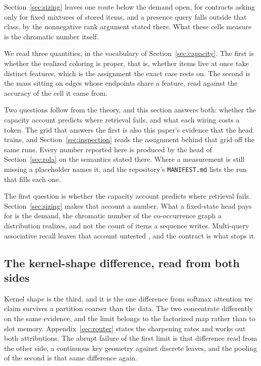 Section~\ref{sec:sizing} leaves one route below the demand open, for contracts asking only for fixed mixtures of stored items, and a presence query falls outside that class, by the nonnegative rank argument stated there. What these cells measure is the chromatic number itself.

We read three quantities, in the vocabulary of Section~\ref{sec:capacity}. The first is whether the realized coloring is proper, that is, whether items live at once take distinct features, which is the assignment the exact case rests on. The second is the mass sitting on edges whose endpoints share a feature, read against the accuracy of the cell it came from.

Two questions follow from the theory, and this section answers both: whether the capacity account predicts where retrieval fails, and what each wiring costs a token. The grid that answers the first is also this paper's evidence that the head trains, and Section~\ref{sec:inspection} reads the assignment behind that grid off the same runs. Every number reported here is produced by the head of Section~\ref{sec:rola} on the semantics stated there. Where a measurement is still missing a placeholder names it, and the repository's \texttt{MANIFEST.md} lists the run that fills each one.

The first question is whether the capacity account predicts where retrieval fails. Section~\ref{sec:sizing} makes that account a number. What a fixed-state head pays for is the demand, the chromatic number of the co-occurrence graph a distribution realizes, and not the count of items a sequence writes. Multi-query associative recall leaves that account untested \citep{arora2023zoology}, and the contract is what stops it.

\subsection{The kernel-shape difference, read from both sides}
\label{apd:kernelshape}

Kernel shape is the third, and it is the one difference from softmax attention we claim survives a partition coarser than the data. The two concentrate differently on the same evidence, and the limit belongs to the factorized map rather than to slot memory. Appendix~\ref{sec:router} states the sharpening rates and works out both attributions. The abrupt failure of the first limit is that difference read from the other side, a continuous key geometry against discrete leaves, and the pooling of the second is that same difference again.

